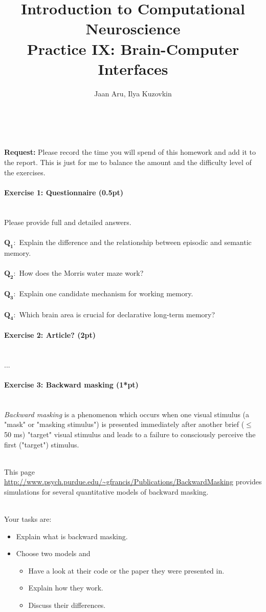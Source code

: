 \documentclass[a4paper,11pt]{article}
\author{\large{Jaan Aru, Ilya Kuzovkin}}
\title{\huge{Introduction to Computational Neuroscience}\\\LARGE{Practice IX: Brain-Computer Interfaces}}
\newenvironment{exercise}[3]{\paragraph{Exercise #1: #2 (#3pt)}\ \\}{
\medskip}
\newcommand{\question}[2]{\setlength\parindent{0mm}\ \\$\mathbf{Q_{#1}:}$ #2\ \\}
\begin{document}
\maketitle


%
%
\ \\

\ \\
\textbf{Request:} Please record the time you will spend of this homework and add it to the report. This is just for me to balance the amount and the difficulty level of the exercises.

%
% 
%
\begin{exercise}{1}{Questionnaire}{0.5}
Please provide full and detailed answers.\\
\question{1}{Explain the difference and the relationship between episodic and semantic memory.}
\question{2}{How does the Morris water maze work?}
\question{3}{Explain one candidate mechanism for working memory.}
\question{4}{Which brain area is crucial for declarative long-term memory?}
\end{exercise}


%
% 
%
\begin{exercise}{2}{Article?}{2}
...
\end{exercise}


%
%
\begin{exercise}{3}{Backward masking}{1*}
\emph{Backward masking} is a phenomenon which occurs when one visual stimulus (a "mask" or "masking stimulus") is presented immediately after another brief ($\leqslant$ 50 ms) "target" visual stimulus and leads to a failure to consciously perceive the first ("target") stimulus.

\ \\
This page \url{http://www.psych.purdue.edu/~gfrancis/Publications/BackwardMasking} provides simulations for several quantitative models of backward masking.

\ \\
Your tasks are:
\begin{itemize}
	\item Explain what is backward masking.
	\item Choose two models and
	\begin{itemize}
		\item Have a look at their code or the paper they were presented in.
		\item Explain how they work.
		\item Discuss their differences.
	\end{itemize}
\end{itemize}

\end{exercise}
\end{document}
